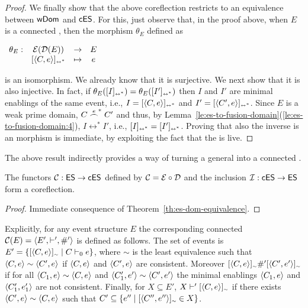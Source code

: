 \begin{proof}
%
  We finally show that the above coreflection restricts to an
  equivalence between $\WDom$ and $\ces$.
  For this, just observe that, in the proof above, when ${E}$ is a connected
  {\esabbr}, then the morphism $\theta_{E}$ defined as
  \begin{center}
    $\begin{array}{lccc}
       \theta_{{E}} : & \ev{\dom{{E}}} &  \to & {E}\\
                             & \eqclassir{\esir{C}{e}} & \mapsto & e
     \end{array}
     $
  \end{center}
  is an isomorphism. We already know that
  it is surjective. We next show that it is also injective. In fact, if
  $\theta_{{E}}(\eqclassir{I}) =
  \theta_{{E}}(\eqclassir{I'})$
  then $I$ and $I'$ are minimal enablings of the same event, i.e.,
  $I = \eqclassir{\esir{C}{e}}$ and $I' = \eqclassir{\esir{C'}{e}}$. Since
  ${E}$ is a weak prime domain, $C \conn{e}^* C'$ and thus, by
  Lemma~\ref{le:es-to-fusion-domain}(\ref{le:es-to-fusion-domain:4}), $I \leftrightarrow^* I'$,
  i.e., $\eqclassir{I} =\eqclassir{I'}$.
  Proving that also the inverse is an {\esabbr} morphism is immediate, by
  exploiting the fact that the {\esabbr} is live.
\end{proof}

The above result indirectly provides a way of turning a general
{\esabbr} into a connected {\esabbr}.

\begin{corollary}
  The functors $\zconnes : \es \to \ces$ defined by
  $\zconnes = \zev \circ \zdom$ and the inclusion
  $\zinces : \ces \to \es$ form a coreflection.
\end{corollary}

\begin{proof}
  Immediate consequence of Theorem~\ref{th:es-dom-equivalence}.
\end{proof}

Explicitly, for any event structure $E$ the corresponding connected {\esabbr} 
$\zconnes(E) = \langle E', \vdash', \#' \rangle$ is defined as follows. 
The set of events is $E' = \{ \eqclass[\sim]{\esir{C}{e}} \mid C \vdash_0 e \}$, 
where $\sim$ is the least equivalence such that $\esir{C}{e} \sim \esir{C'}{e}$ 
if $\esir{C}{e}$ and $\esir{C'}{e}$ are consistent. 
%
Moreover $\eqclass[\sim]{\esir{C}{e}} \#' \eqclass[\sim]{\esir{C'}{e'}}$ if for all 
$\esir{C_1}{e} \sim \esir{C}{e}$ and $\esir{C_1'}{e'} \sim \esir{C'}{e'}$ the 
minimal enablings $\esir{C_1}{e}$ and $\esir{C_1'}{e_1'}$ are not consistent. 
Finally, for $X \subseteq E'$, $X \vdash' \eqclass[\sim]{\esir{C}{e}}$ if there 
exists $\esir{C'}{e} \sim \esir{C}{e}$ such that 
$C' \subseteq \{ e'' \mid \eqclass[\sim]{\esir{C''}{e''}} \in X\}$.

